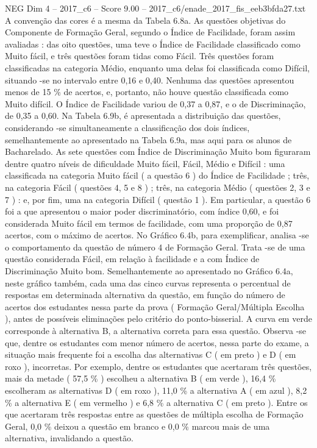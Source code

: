 \begin{textsample}{NEG Dim 4 – 2017\_c6 – Score 9.00 – 2017\_c6/enade\_2017\_fis\_eeb3bfda27.txt}
A convenção das cores é a mesma da Tabela 6.8a.
As questões objetivas do Componente de Formação Geral, segundo o Índice de Facilidade, foram assim avaliadas : das oito questões, uma teve o Índice de Facilidade classificado como Muito fácil, e três questões foram tidas como Fácil.
Três questões foram classificadas na categoria Médio, enquanto uma delas foi classificada como Difícil, situando -se no intervalo entre 0,16 e 0,40.
Nenhuma das questões apresentou menos de 15 \% de acertos, e, portanto, não houve questão classificada como Muito difícil.
O Índice de Facilidade variou de 0,37 a 0,87, e o de Discriminação, de 0,35 a 0,60.
Na Tabela 6.9b, é apresentada a distribuição das questões, considerando -se simultaneamente a classificação dos dois índices, semelhantemente ao apresentado na Tabela 6.9a, mas aqui para os alunos de Bacharelado.
As sete questões com Índice de Discriminação Muito bom figuraram dentre quatro níveis de dificuldade Muito fácil, Fácil, Médio e Difícil : uma classificada na categoria Muito fácil ( a questão 6 ) do Índice de Facilidade ; três, na categoria Fácil ( questões 4, 5 e 8 ) ; três, na categoria Médio ( questões 2, 3 e 7 ) : e, por fim, uma na categoria Difícil ( questão 1 ).
Em particular, a questão 6 foi a que apresentou o maior poder discriminatório, com índice 0,60, e foi considerada Muito fácil em termos de facilidade, com uma proporção de 0,87 acertos, com o máximo de acertos.
No Gráfico 6.4b, para exemplificar, analisa -se o comportamento da questão de número 4 de Formação Geral.
Trata -se de uma questão considerada Fácil, em relação à facilidade e a com Índice de Discriminação Muito bom.
Semelhantemente ao apresentado no Gráfico 6.4a, neste gráfico também, cada uma das cinco curvas representa o percentual de respostas em determinada alternativa da questão, em função do número de acertos dos estudantes nessa parte da prova ( Formação Geral/Múltipla Escolha ), antes de possíveis eliminações pelo critério do ponto-bisserial.
A curva em verde corresponde à alternativa B, a alternativa correta para essa questão.
Observa -se que, dentre os estudantes com menor número de acertos, nessa parte do exame, a situação mais frequente foi a escolha das alternativas C ( em preto ) e D ( em roxo ), incorretas.
Por exemplo, dentre os estudantes que acertaram três questões, mais da metade ( 57,5 \% ) escolheu a alternativa B ( em verde ), 16,4 \% escolheram as alternativas D ( em roxo ), 11,0 \% a alternativa A ( em azul ), 8,2 \% a alternativa E ( em vermelho ) e 6,8 \% a alternativa C ( em preto ).
Entre os que acertaram três respostas entre as questões de múltipla escolha de Formação Geral, 0,0 \% deixou a questão em branco e 0,0 \% marcou mais de uma alternativa, invalidando a questão.

\end{textsample}
